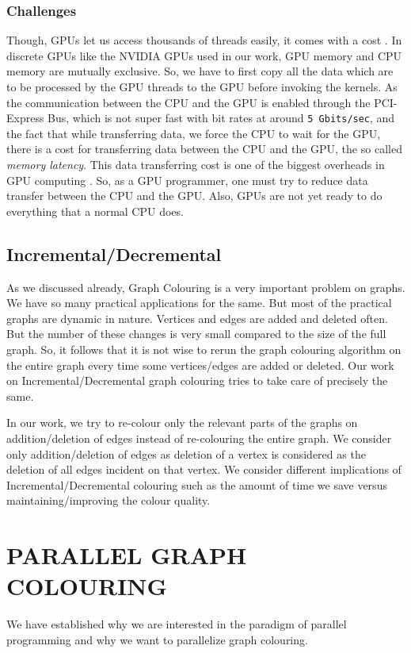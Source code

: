 \documentclass[MTech]{iitmdiss}
\begin{document}
\subsection{Challenges}
Though, GPUs let us access thousands of threads easily, it comes with a cost \citep{Lee:2010:DGV:1816038.1816021}. In discrete GPUs like the NVIDIA GPUs used in our work, GPU memory and CPU memory are mutually exclusive. So, we have to first copy all the data which are to be processed by the GPU threads to the GPU before invoking the kernels. As the communication between the CPU and the GPU is enabled through the PCI-Express Bus, which is not super fast with bit rates at around \verb+5 Gbits/sec+, and the fact that while transferring data, we force the CPU to wait for the GPU, there is a cost for transferring data between the CPU and the GPU, the so called \textit{memory latency}. This data transferring cost is one of the biggest overheads in GPU computing \citep{hovland2008latency}. So, as a GPU programmer, one must try to reduce data transfer between the CPU and the GPU. Also, GPUs are not yet ready to do everything that a normal CPU does.  
\section{Incremental/Decremental}
As we discussed already, Graph Colouring is a very important problem on graphs. We have so many practical applications for the same. But most of the practical graphs are dynamic in nature. Vertices and edges are added and deleted often. But the number of these changes is very small compared to the size of the full graph. So, it follows that it is not wise to rerun the graph colouring algorithm on the entire graph every time some vertices/edges are added or deleted. Our work on Incremental/Decremental graph colouring tries to take care of precisely the same.

In our work, we try to re-colour only the relevant parts of the graphs on addition/deletion of edges instead of re-colouring the entire graph. We consider only addition/deletion of edges as deletion of a vertex is considered as the deletion of all edges incident on that vertex. We consider different implications of Incremental/Decremental colouring such as the amount of time we save versus maintaining/improving the colour quality.

\chapter{PARALLEL GRAPH COLOURING}
We have established why we are interested in the paradigm of parallel programming and why we want to parallelize graph colouring.
\end{document}
